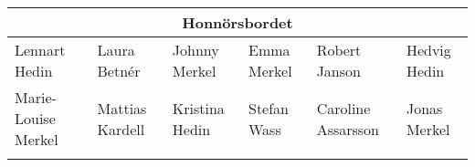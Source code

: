 \documentclass[a5paper]{article}
\begin{document}
	\thispagestyle{empty}

	\begingroup
	\fontsize{10pt}{10.3pt}\selectfont

	\begin{landscape}
		
\begin{center}											
	\begin{tabular}{  l l l l l l}											
		\multicolumn{6}{c}{\textbf{Honnörsbordet}} \\ \hline											
		Lennart Hedin	&	Laura Betnér	&	Johnny Merkel	&	Emma Merkel	&	Robert Janson	&	Hedvig Hedin	\\
		Marie-Louise Merkel	&	Mattias Kardell	&	Kristina Hedin	&	Stefan Wass	&	Caroline Assarsson	&	Jonas Merkel	\\ 
		\\ \hline
	\end{tabular}											
\end{center}											


\end{landscape}
\end{document}
